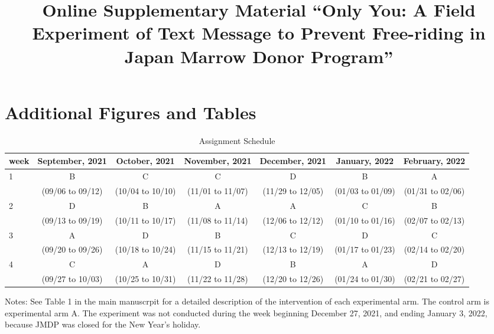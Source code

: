 \documentclass[12pt, a4paper]{article}
\title{Online Supplementary Material
``Only You: A Field Experiment of Text Message to Prevent Free-riding in Japan Marrow Donor Program''}
\author{}
\date{}
\begin{document}
\begin{spacing}{1}
  \maketitle
  \end{spacing}



\setcounter{footnote}{0}
\appendix

\setcounter{figure}{0}
\setcounter{table}{0}
\renewcommand\thefigure{\thesection\arabic{figure}}
\renewcommand{\thetable}{\thesection\arabic{table}}
\renewcommand{\theHfigure}{\thesection\arabic{figure}}
\renewcommand{\theHtable}{\thesection\arabic{table}}

\hypertarget{figtab}{%
\section{Additional Figures and Tables}\label{figtab}}

\begin{table}[H]

\caption{\label{tab:assignment}Assignment Schedule}
\centering
\fontsize{9}{11}\selectfont
\begin{threeparttable}
\begin{tabular}[t]{lcccccc}
\toprule
week & September, 2021 & October, 2021 & November, 2021 & December, 2021 & January, 2022 & February, 2022\\
\midrule
1 & B & C & C & D & B & A\\
 & (09/06 to 09/12) & (10/04 to 10/10) & (11/01 to 11/07) & (11/29 to 12/05) & (01/03 to 01/09) & (01/31 to 02/06)\\
2 & D & B & A & A & C & B\\
 & (09/13 to 09/19) & (10/11 to 10/17) & (11/08 to 11/14) & (12/06 to 12/12) & (01/10 to 01/16) & (02/07 to 02/13)\\
3 & A & D & B & C & D & C\\
 & (09/20 to 09/26) & (10/18 to 10/24) & (11/15 to 11/21) & (12/13 to 12/19) & (01/17 to 01/23) & (02/14 to 02/20)\\
4 & C & A & D & B & A & D\\
 & (09/27 to 10/03) & (10/25 to 10/31) & (11/22 to 11/28) & (12/20 to 12/26) & (01/24 to 01/30) & (02/21 to 02/27)\\
\bottomrule
\end{tabular}
\begin{tablenotes}
\item Notes: See Table 1 in the main manuscrpit for a detailed description of the intervention of each experimental arm. The control arm is experimental arm A. The experiment was not conducted during the week beginning December 27, 2021, and ending January 3, 2022, because JMDP was closed for the New Year's holiday.
\end{tablenotes}
\end{threeparttable}
\end{table}
\end{document}
